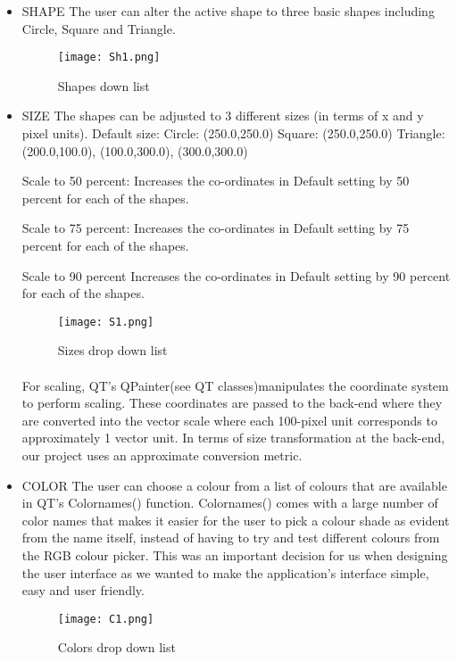 \documentclass{article}
\begin{document}
\begin{itemize}
    \item SHAPE
    \newline
    The user can alter the active shape to three basic shapes including Circle, Square and Triangle. 
    
    \begin{figure}[!h]
\centering
\texttt{[image: Sh1.png]}
\caption{Shapes down list \label{shape}}
\end{figure}


    \item SIZE
    \newline
    The shapes can be adjusted to 3 different sizes (in terms of x and y pixel units). \newline
Default size: \newline
Circle: (250.0,250.0) \newline
Square: (250.0,250.0) \newline
Triangle: (200.0,100.0),  (100.0,300.0), (300.0,300.0)

Scale to 50 percent:
Increases the co-ordinates in Default setting by 50 percent for each of the shapes.

Scale to 75 percent:
Increases the co-ordinates in Default setting by 75 percent for each of the shapes.

Scale to 90 percent
Increases the co-ordinates in Default setting by 90 percent for each of the shapes.

\begin{figure}[!h]
\centering
\texttt{[image: S1.png]}
\caption{Sizes drop down list \label{Size}}
\end{figure}


\paragraph{}
For scaling, QT’s QPainter(see QT classes)manipulates the coordinate system to perform scaling. These coordinates are passed to the back-end where they are converted into the vector scale where each 100-pixel unit corresponds to approximately 1 vector unit. In terms of size transformation at the back-end, our project uses an approximate conversion metric.

\item COLOR \newline
The user can choose a colour from a list of colours that are available in QT’s Colornames() function. Colornames() comes with a large number of color names that makes it easier for the user to pick a colour shade as evident from the name itself, instead of having to try and test different colours from the RGB colour picker. This was an important decision for us when designing the user interface as we wanted to make the application’s interface simple, easy and user friendly.

\begin{figure}[!h]
\centering
\texttt{[image: C1.png]}
\caption{Colors drop down list \label{Color}}
\end{figure}

\end{itemize}
\end{document}
